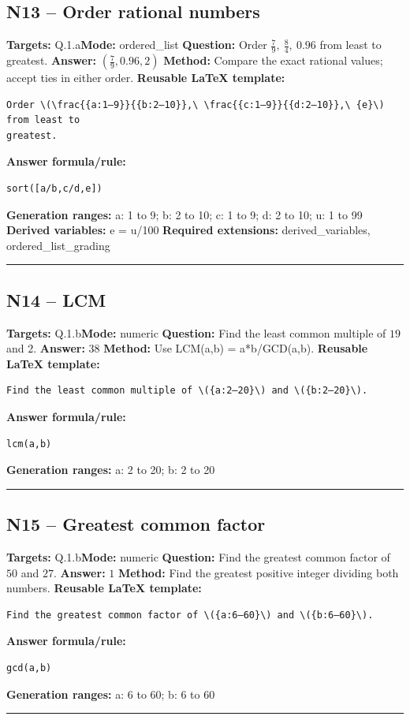 \documentclass[11pt]{article}
\begin{document}
\subsection{N13 -- Order rational numbers}
\textbf{Targets:} Q.1.a\quad\textbf{Mode:} ordered\_list
\textbf{Question:} Order \(\frac{7}{9},\ \frac{8}{4},\ 0.96\) from least to greatest.
\textbf{Answer:} \((\frac{7}{9}, 0.96, 2)\)
\textbf{Method:} Compare the exact rational values; accept ties in either order.
\textbf{Reusable LaTeX template:}
\begin{verbatim}
Order \(\frac{{a:1–9}}{{b:2–10}},\ \frac{{c:1–9}}{{d:2–10}},\ {e}\) from least to
greatest.
\end{verbatim}
\textbf{Answer formula/rule:}
\begin{verbatim}
sort([a/b,c/d,e])
\end{verbatim}
\textbf{Generation ranges:} a: 1 to 9; b: 2 to 10; c: 1 to 9; d: 2 to 10; u: 1 to 99
\textbf{Derived variables:} e = u/100
\textbf{Required extensions:} derived\_variables, ordered\_list\_grading
\medskip\hrule\medskip
\subsection{N14 -- LCM}
\textbf{Targets:} Q.1.b\quad\textbf{Mode:} numeric
\textbf{Question:} Find the least common multiple of \(19\) and \(2\).
\textbf{Answer:} \(38\)
\textbf{Method:} Use LCM(a,b) = a*b/GCD(a,b).
\textbf{Reusable LaTeX template:}
\begin{verbatim}
Find the least common multiple of \({a:2–20}\) and \({b:2–20}\).
\end{verbatim}
\textbf{Answer formula/rule:}
\begin{verbatim}
lcm(a,b)
\end{verbatim}
\textbf{Generation ranges:} a: 2 to 20; b: 2 to 20
\medskip\hrule\medskip
\subsection{N15 -- Greatest common factor}
\textbf{Targets:} Q.1.b\quad\textbf{Mode:} numeric
\textbf{Question:} Find the greatest common factor of \(50\) and \(27\).
\textbf{Answer:} \(1\)
\textbf{Method:} Find the greatest positive integer dividing both numbers.
\textbf{Reusable LaTeX template:}
\begin{verbatim}
Find the greatest common factor of \({a:6–60}\) and \({b:6–60}\).
\end{verbatim}
\textbf{Answer formula/rule:}
\begin{verbatim}
gcd(a,b)
\end{verbatim}
\textbf{Generation ranges:} a: 6 to 60; b: 6 to 60
\medskip\hrule\medskip
\end{document}
